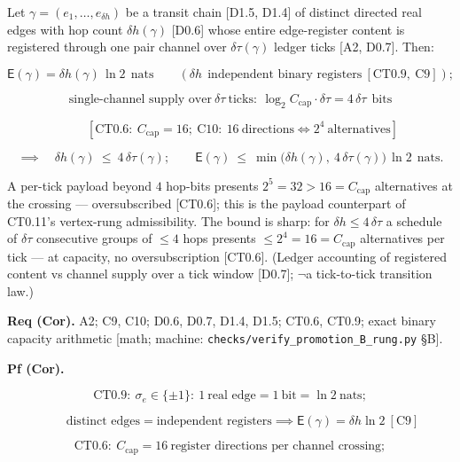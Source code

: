 \begin{corollary}\label{tag:CT0-6a}
Let $\gamma=(e_1,\dots,e_{\delta h})$ be a transit chain [D1.5, D1.4] of distinct directed real edges with hop count $\delta h(\gamma)$ [D0.6] whose entire edge-register content is registered through one pair channel over $\delta\tau(\gamma)$ ledger ticks [A2, D0.7]. Then:

\[
\mathsf E(\gamma)=\delta h(\gamma)\,\ln2\ \ \text{nats}\qquad(\delta h\ \ \text{independent binary registers}\ [\mathrm{CT0.9},\ \mathrm{C9}]);
\]

\[
\text{single-channel supply over}\ \delta\tau\ \text{ticks}:\ \log_2C_{\mathrm{cap}}\cdot\delta\tau=4\,\delta\tau\ \ \text{bits}
\]

\[
\qquad [\mathrm{CT0.6}:\ C_{\mathrm{cap}}=16;\ \mathrm{C10}:\ 16\ \text{directions}\iff2^{4}\ \text{alternatives}]
\]

\[
\implies\quad\delta h(\gamma)\ \le\ 4\,\delta\tau(\gamma);\qquad
\mathsf E(\gamma)\ \le\ \min\bigl(\delta h(\gamma),\ 4\,\delta\tau(\gamma)\bigr)\,\ln2\ \ \text{nats}.
\]

A per-tick payload beyond $4$ hop-bits presents $2^{5}=32>16=C_{\mathrm{cap}}$ alternatives at the crossing — oversubscribed [CT0.6]; this is the payload counterpart of CT0.11's vertex-rung admissibility. The bound is sharp: for $\delta h\le4\,\delta\tau$ a schedule of $\delta\tau$ consecutive groups of $\le4$ hops presents $\le2^{4}=16=C_{\mathrm{cap}}$ alternatives per tick — at capacity, no oversubscription [CT0.6]. (Ledger accounting of registered content vs channel supply over a tick window [D0.7]; $\neg$a tick-to-tick transition law.)

\textbf{Req (Cor).} A2; C9, C10; D0.6, D0.7, D1.4, D1.5; CT0.6, CT0.9; exact binary capacity arithmetic [math; machine: \texttt{checks/\allowbreak{}verify\_\allowbreak{}promotion\_\allowbreak{}B\_\allowbreak{}rung.py} §B].

\textbf{Pf (Cor).}

\[
\mathrm{CT0.9}:\ \sigma_e\in\{\pm1\}:\ 1\ \text{real edge}=1\ \text{bit}=\ln2\ \text{nats};
\]

\[
\qquad \text{distinct edges}=\text{independent registers}\implies\mathsf E(\gamma)=\delta h\ln2\ [\mathrm{C9}]
\]

\[
\mathrm{CT0.6}:\ C_{\mathrm{cap}}=16\ \text{register directions per channel crossing};
\]


\end{corollary}
